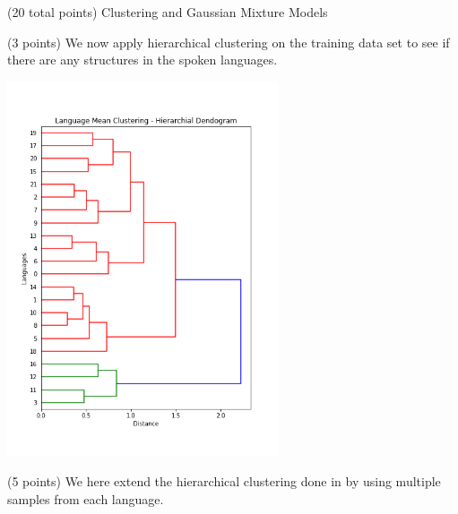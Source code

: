 \documentclass[12pt]{article}
\begin{document}
\begin{question}{(20 total points) Clustering and Gaussian Mixture Models}
\begin{subquestion}{(3 points)
       We now apply hierarchical clustering on the training data set
       to see if there are any structures in the spoken languages.
     }
      \begin{answerbox}{35em}
        \begin{center}
            \includegraphics[width=0.6\textwidth]{results/3_3.png}
        \end{center}
      \end{answerbox}
  


   \end{subquestion}
   \begin{subquestion}{(5 points)
       We here extend the hierarchical clustering done in  by
       using multiple samples from each language.
     } \label{Q3.4}


   


\end{subquestion}
\end{question}
\end{document}
